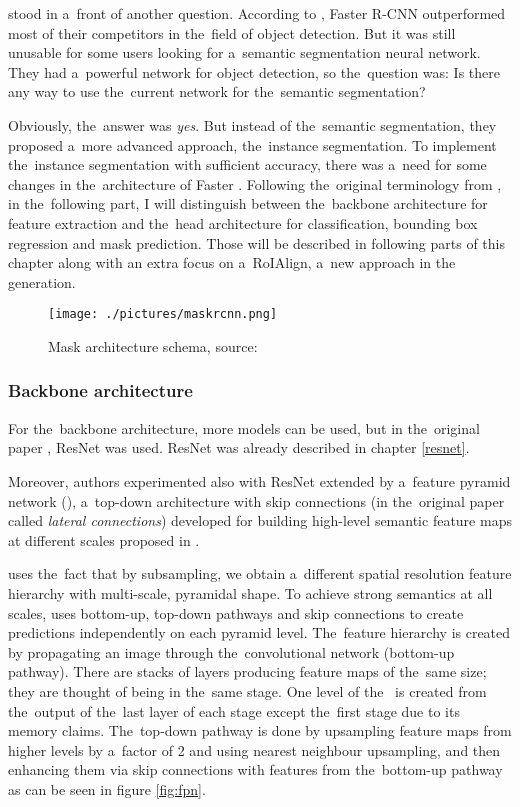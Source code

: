  stood in a~front of another question. According to \cite{faster-rcnn}, 
Faster R-CNN outperformed most of their competitors in the~field of object 
detection. But it was still unusable for some users looking for a~semantic 
segmentation neural network. They had a~powerful network for object detection, 
so the~question was: Is there any way to use the~current network for
the~semantic segmentation?

Obviously, the~answer was \textit{yes}. But instead of the~semantic 
segmentation, they proposed a~more advanced approach, the~instance segmentation. 
To implement the~instance segmentation with sufficient accuracy, there was
a~need for some changes in the~architecture of Faster . Following
the~original terminology from \cite{mask-rcnn}, in the~following part, I will 
distinguish between the~backbone architecture for feature extraction and
the~head architecture for classification, bounding box regression and mask 
prediction. Those will be described in following parts of this chapter along 
with an extra focus on a~RoIAlign, a~new approach in the~ generation.

\begin{figure}[H]
   \centering
	\texttt{[image: ./pictures/maskrcnn.png]}
	\caption[Mask R-CNN architecture]{Mask  architecture schema, source: 
\cite{mask-rcnn}}
      \label{fig:mask-rcnn}
\end{figure}

\subsubsection{Backbone architecture}
\label{backbone}

For the~backbone architecture, more models can be used, but in the~original 
paper \cite{mask-rcnn}, ResNet was used. ResNet was already described in chapter 
\ref{resnet}.

Moreover, authors experimented also with ResNet extended by a~feature pyramid 
network (), a~top-down architecture with skip connections (in
the~original paper called \textit{lateral connections}) developed for building 
high-level semantic feature maps at different scales proposed in \cite{fpn}.

 uses the~fact that by subsampling, we obtain a~different spatial 
resolution feature hierarchy with multi-scale, pyramidal shape. To achieve 
strong semantics at all scales,  uses bottom-up, top-down pathways and 
skip connections to create predictions independently on each pyramid level.
The~feature hierarchy is created by propagating an image through the~convolutional 
network (bottom-up pathway). There are stacks of layers producing feature maps 
of the~same size; they are thought of being in the~same stage. One level of
the~ is created from the~output of the~last layer of each stage except
the~first stage due to its memory claims. The~top-down pathway is done by upsampling 
feature maps from higher levels by a~factor of 2 and using nearest neighbour 
upsampling, and then enhancing them via skip connections with features from
the~bottom-up pathway as can be seen in figure \ref{fig:fpn}.

